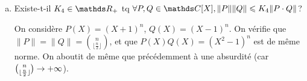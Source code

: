 \documentclass[a4paper, 12pt]{article}
\begin{document}
\begin{enumerate}[a)]
\begin{corr}
			On a donc $\|\tilde P \tilde Q \| \geqslant m$, d'où, en multipliant par $\|P\|\|Q\|$:
			$$ \|P \cdot Q\| \geqslant m \|P\|\|Q\|$$
			
			$ K_3 = \frac 1 m$ convient. ($m \not = 0$ car ce miminimum est atteint, et que $PQ=0$ ssi $P = 0$ ou $Q=0$, ce qui est absurde)
		\end{corr}
		
		\item Existe-t-il $K_4 \in \R_+$ tq $\forall P, Q \in \C[X], \|P\|\|Q\| \leqslant K_4\|P\cdot Q\|$?
		\begin{corr}
			On considère $P(X) = (X+1)^n$, $Q(X) = (X-1)^n$. On vérifie que $\|P\| = \|Q\| = \binom {n} {\lfloor \frac n 2 \rfloor}$, et que $P(X) Q(X) = (X^2 - 1)^n$ est de même norme. On aboutit de même que précédemment à une absurdité (car $\binom{n}{\lfloor \frac n 2 \rfloor} \cv +\infty$).
		\end{corr}
	\end{enumerate}
\end{document}
